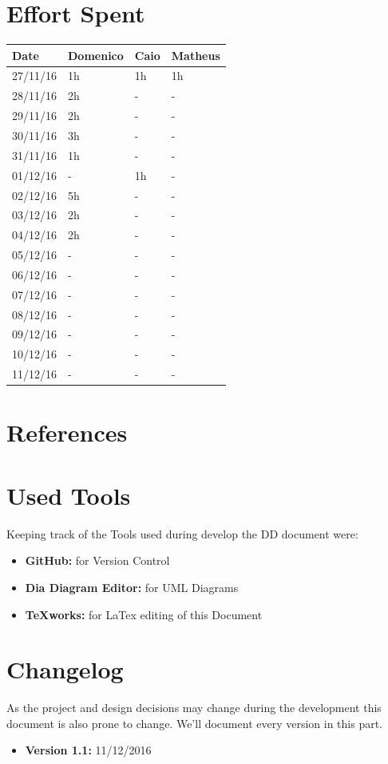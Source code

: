 \documentclass[a4paper]{article}
\begin{document}
\newpage
\section{Effort Spent}
\begin{tabular}{ | l | l | l | l | }
\hline
	\textbf {Date} & \textbf {Domenico} & \textbf {Caio} & \textbf {Matheus} \\ \hline
	27/11/16& 1h & 1h & 1h  \\ \hline
	28/11/16& 2h & - & - \\ \hline
	29/11/16& 2h & - & - \\ \hline
	30/11/16& 3h & - & - \\ \hline
	31/11/16& 1h & - & - \\ \hline
	01/12/16& - & 1h & - \\ \hline
	02/12/16& 5h & - & - \\ \hline
	03/12/16& 2h & - & - \\ \hline
	04/12/16& 2h & - & - \\ \hline
	05/12/16& - & - & - \\ \hline
	06/12/16& - & - & - \\ \hline
	07/12/16& - & - & - \\ \hline
	08/12/16& - & - & - \\ \hline
	09/12/16& - & - & - \\ \hline
	10/12/16& - & - & - \\ \hline
	11/12/16& - & - & - \\ \hline
\end{tabular}
\newpage

\section{References}
\newpage


\section{Used Tools}
Keeping track of the Tools used during develop the DD document were:
\begin{itemize}
	\item \textbf{GitHub:} for Version Control
	\item \textbf {Dia Diagram Editor:} for UML Diagrams
	\item \textbf {TeXworks:} for LaTex editing of this Document
\end{itemize}
\newpage

\section{Changelog}
As the project and design decisions may change during the development this document is also prone to change.
We'll document every version in this part.
\begin{itemize}
\item \textbf {Version 1.1:} 11/12/2016
\end{itemize}
\end{document}
